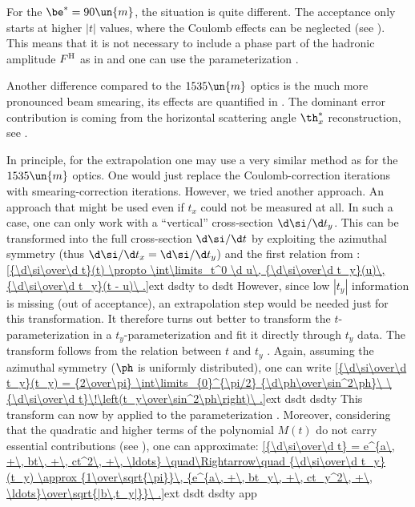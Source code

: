 \def\OutlineLabel{Extrapolation for beta* = 90 m optics}

For the $\be^* = 90\un{m}$, the situation is quite different. The acceptance only starts at higher $|t|$ values, where the Coulomb effects can be neglected (see ). This means that it is not necessary to include a phase part of the hadronic amplitude $F^{\rm H}$ as in  and one can use the parameterization . 

Another difference compared to the $1535\un{m}$ optics is the much more pronounced beam smearing, its effects are quantified in . The dominant error contribution is coming from the horizontal scattering angle $\th_x^*$ reconstruction, see .

In principle, for the extrapolation one may use a very similar method as for the $1535\un{m}$ optics. One would just replace the Coulomb-correction iterations with smearing-correction iterations. However, we tried another approach. An approach that might be used even if $t_x$ could not be measured at all. In such a case, one can only work with a ``vertical'' cross-section $\d\si/\d t_y$. This can be transformed into the full cross-section $\d\si/\d t$ by exploiting the azimuthal symmetry (thus $\d\si/\d t_x = \d\si/\d t_y$) and the first relation from :
\eqref{{\d\si\over\d t}(t) \propto \int\limits_t^0 \d u\, {\d\si\over\d t_y}(u)\, {\d\si\over\d t_y}(t - u)\ .}{ext dsdty to dsdt}
However, since low $|t_y|$ information is missing (out of acceptance), an extrapolation step would be needed just for this transformation. It therefore turns out better to transform the $t$-parameterization  in a $t_y$-parameterization and fit it directly through $t_y$ data. The transform follows from the relation between $t$ and $t_y$ . Again, assuming the azimuthal symmetry ($\ph$ is uniformly distributed), one can write
\eqref{{\d\si\over\d t_y}(t_y) = {2\over\pi} \int\limits_{0}^{\pi/2} {\d\ph\over\sin^2\ph}\ \ {\d\si\over\d t}\!\left(t_y\over\sin^2\ph\right)\ .}{ext dsdt dsdty}
This transform can now by applied to the parameterization . Moreover, considering that the quadratic and higher terms of the polynomial $M(t)$ do not carry essential contributions (see ), one can approximate:
\eqref{{\d\si\over\d t} = e^{a\, +\, bt\, +\, ct^2\, +\, \ldots} \quad\Rightarrow\quad {\d\si\over\d t_y}(t_y) \approx {1\over\sqrt{\pi}}\, {e^{a\, +\, bt_y\, +\, ct_y^2\, +\, \ldots}\over\sqrt{|b\,t_y|}}\ .}{ext dsdt dsdty app}


